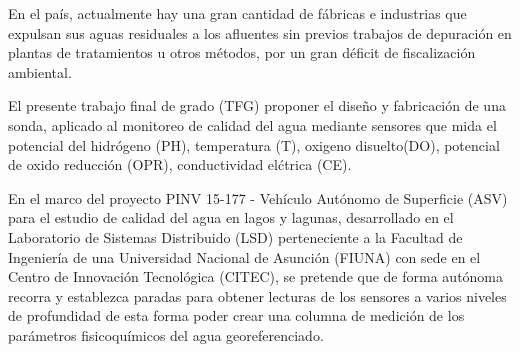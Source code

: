 En el pa\'is, actualmente hay una gran cantidad de f\'abricas e industrias que expulsan sus aguas residuales a los afluentes sin previos trabajos de depuraci\'on en plantas de tratamientos u otros m\'etodos, por un gran d\'eficit de fiscalizaci\'on ambiental.

%
%
%
%

El presente trabajo final de grado (TFG) proponer el dise\~no y fabricación de una sonda, aplicado al monitoreo de calidad del agua mediante sensores que mida el potencial del hidr\'ogeno (PH), temperatura (T), oxigeno disuelto(DO), potencial de oxido reducci\'on (OPR), conductividad el\'ctrica (CE).
 
En el marco del proyecto  PINV 15-177 - Veh\'iculo Aut\'onomo de Superficie (ASV) para el estudio de calidad del agua en lagos y lagunas, desarrollado en el Laboratorio de Sistemas Distribuido (LSD) perteneciente a la Facultad de Ingenier\'ia de una Universidad Nacional de Asunci\'on (FIUNA) con sede en el Centro de Innovaci\'on Tecnol\'ogica (CITEC), se pretende que de forma aut\'onoma recorra y establezca paradas para obtener lecturas de los sensores a varios niveles de profundidad de esta forma poder crear una columna de medición de los parámetros fisicoquímicos del agua georeferenciado.

